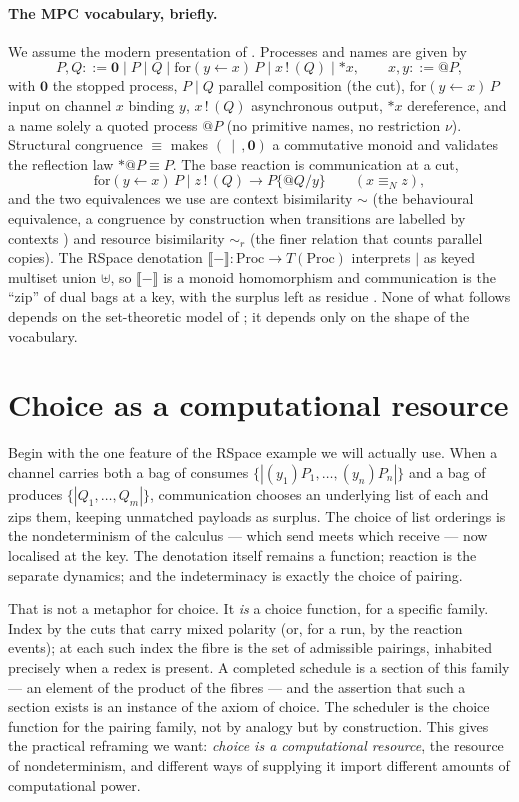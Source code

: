 \documentclass[11pt]{article}
\makeatletter
\theoremstyle{definition}
\theoremstyle{plain}
\theoremstyle{remark}
\newcommand{\quoteP}{@}                       %
\newcommand{\deref}{{*}}                       %
\newcommand{\inn}[3]{\mathrm{for}(#1 \leftarrow #2)\,#3}
\newcommand{\out}[2]{#1\,!\,(#2)}
\newcommand{\nil}{\mathbf{0}}
\newcommand{\rcong}{\equiv}
\newcommand{\bisim}{\sim}
\newcommand{\rbisim}{\sim_{r}}
\newcommand{\reduces}{\longrightarrow}
\newcommand{\sem}[1]{\llbracket #1 \rrbracket}
\newcommand{\bagunion}{\uplus}
\newcommand{\Proc}{\mathrm{Proc}}
\newcommand{\Cut}{\mid}
\makeatother
\begin{document}
\paragraph{The MPC vocabulary, briefly.}
We assume the modern presentation of \cite{qcs}. Processes and names are given
by
\[
P,Q ::= \nil \mid P \Cut Q \mid \inn{y}{x}{P} \mid \out{x}{Q} \mid \deref x,
\qquad x,y ::= \quoteP P,
\]
with $\nil$ the stopped process, $P\Cut Q$ parallel composition (the cut),
$\inn{y}{x}{P}$ input on channel $x$ binding $y$, $\out{x}{Q}$ asynchronous
output, $\deref x$ dereference, and a name solely a quoted process $\quoteP P$
(no primitive names, no restriction $\nu$). Structural congruence $\rcong$ makes
$(\,\Cut\,,\nil)$ a commutative monoid and validates the reflection law
$\deref\quoteP P \rcong P$. The base reaction is communication at a cut,
\[
\inn{y}{x}{P} \Cut \out{z}{Q} \reduces P\{\quoteP Q / y\}
\qquad (x \equiv_N z),
\]
and the two equivalences we use are context bisimilarity $\bisim$ (the
behavioural equivalence, a congruence by construction when transitions are
labelled by contexts \cite{leifermilner,sewell,oslf}) and resource
bisimilarity $\rbisim$ (the finer relation that counts parallel copies). The
RSpace denotation $\sem{-}\colon \Proc \to T(\Proc)$ interprets $\Cut$ as
keyed multiset union $\bagunion$, so $\sem{-}$ is a monoid homomorphism and
communication is the ``zip'' of dual bags at a key, with the surplus left as
residue \cite{qcs}. None of what follows depends on the set-theoretic model of
\cite{qcs,paths}; it depends only on the shape of the vocabulary.

\section{Choice as a computational resource}\label{sec:choice}

Begin with the one feature of the RSpace example we will actually use. When a
channel carries both a bag of consumes $\{\!|(y_1)P_1,\dots,(y_n)P_n|\!\}$ and a
bag of produces $\{\!|Q_1,\dots,Q_m|\!\}$, communication chooses an underlying
list of each and zips them, keeping unmatched payloads as surplus. The choice of
list orderings is the nondeterminism of the calculus --- which send meets which
receive --- now localised at the key. The denotation itself remains a function;
reaction is the separate dynamics; and the indeterminacy is exactly the choice of
pairing.

That is not a metaphor for choice. It \emph{is} a choice function, for a specific
family. Index by the cuts that carry mixed polarity (or, for a run, by the
reaction events); at each such index the fibre is the set of admissible pairings,
inhabited precisely when a redex is present. A completed schedule is a section of
this family --- an element of the product of the fibres --- and the assertion that
such a section exists is an instance of the axiom of choice. The scheduler is the
choice function for the pairing family, not by analogy but by construction. This
gives the practical reframing we want: \emph{choice is a computational resource},
the resource of nondeterminism, and different ways of supplying it import
different amounts of computational power.
\end{document}
